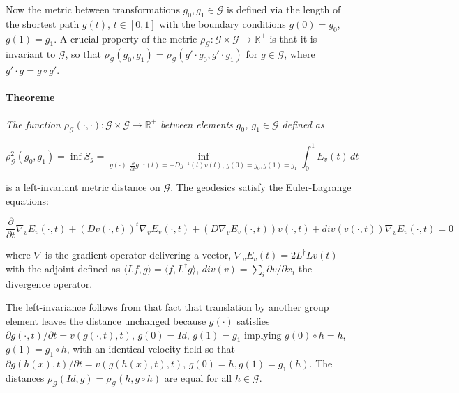 \documentclass[preprint,review,8pt,times]{elsarticle}
\begin{document}
Now the metric between transformations $g_{0}, g_{1} \in \mathcal{G}$ is defined via the length of the shortest path $g(t)$, $t \in [0, 1]$ with the boundary conditions $g(0) = g_{0}$, $g(1) = g_{1}$. A crucial property of the metric $\rho_{\mathcal{G}}: \mathcal{G} \times \mathcal{G} \rightarrow \mathbb{R}^{+}$ is that it is invariant to $\mathcal{G}$, so that $\rho_{\mathcal{G}}(g_{0}, g_{1}) = \rho_{\mathcal{G}}(g' \cdot g_{0}, g' \cdot g_{1})$ for $g \in \mathcal{G}$, where $g' \cdot g = g \circ g'$.

\paragraph{Theoreme}{\it The function $\rho_{\mathcal{G}}(\cdot, \cdot): \mathcal{G} \times \mathcal{G} \rightarrow \mathbb{R}^{+}$ between elements $g_{0}$, $g_{1} \in \mathcal{G}$ defined as

$$
\rho_{\mathcal{G}}^{2}(g_{0}, g_{1}) = \inf S_{g} = \underset{g(\cdot):\frac{\partial}{\partial t}g^{-1}(t) = -Dg^{-1}(t)v(t),\, g(0)=g_{0}, g(1) = g_{1}}{\inf} \int_{0}^{1} E_{v}(t) \, dt 
$$

is a left-invariant metric distance on $\mathcal{G}$. The geodesics satisfy the Euler-Lagrange equations:

$$
\frac{\partial}{\partial t} \nabla_{v}E_{v}(\cdot, t) + (Dv(\cdot, t))^{t} \nabla_{v}E_{v}(\cdot, t) + (D \nabla_{v}E_{v}(\cdot, t))v(\cdot, t) + div( v(\cdot, t)) \nabla_{v}E_{v}(\cdot, t) = 0
$$

where $\nabla$ is the gradient operator delivering a vector, $\nabla_{v}E_{v}(t) = 2L^{\dag}Lv(t)$ with the adjoint defined as $\langle Lf, g\rangle = \langle f, L^{\dag}g \rangle$, $div(v) = \sum_{i} \partial v/ \partial x_{i}$ the divergence operator.\\
}

The left-invariance follows from that fact that translation by another group element leaves the distance unchanged because $g(\cdot)$ satisfies $\partial g(\cdot, t) / \partial t = v(g(\cdot, t), t)$, $g(0) = Id$, $g(1) = g_{1}$ implying $g(0) \circ h = h$, $g(1) = g_{1} \circ h$, with an identical velocity field so that $\partial g(h(x),t)/\partial t = v(g(h(x),t),t)$, $g(0) = h, g(1) = g_{1}(h)$. The distances $\rho_{\mathcal{G}}(Id, g) = \rho_{\mathcal{G}}(h, g \circ h)$ are equal for all $h \in \mathcal{G}$.
\end{document}
